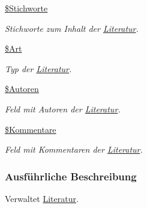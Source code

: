 \begin{CompactItemize}
\hyperlink{classLiteratur_aa77f0f697d4bcf72279aadedd91ddff}{\$Stichworte}
\begin{CompactList}\small\item\em Stichworte zum Inhalt der \hyperlink{classLiteratur}{Literatur}. \item\end{CompactList}\item 
\hyperlink{classLiteratur_fb4d4b1ce29a33a10e3e27d47f31a447}{\$Art}
\begin{CompactList}\small\item\em Typ der \hyperlink{classLiteratur}{Literatur}. \item\end{CompactList}\item 
\hyperlink{classLiteratur_01b311917d78c1dbb346435598ebba64}{\$Autoren}
\begin{CompactList}\small\item\em Feld mit Autoren der \hyperlink{classLiteratur}{Literatur}. \item\end{CompactList}\item 
\hyperlink{classLiteratur_ebcaeb5c38ce2677a14189da511fa663}{\$Kommentare}
\begin{CompactList}\small\item\em Feld mit Kommentaren der \hyperlink{classLiteratur}{Literatur}. \item\end{CompactList}\end{CompactItemize}


\subsubsection{Ausf\"{u}hrliche Beschreibung}
Verwaltet \hyperlink{classLiteratur}{Literatur}. 

